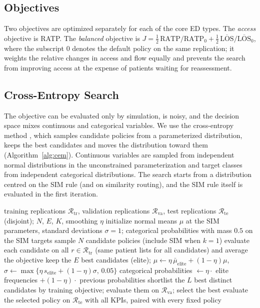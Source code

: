 \subsection{Objectives}

Two objectives are optimized separately for each of the \NEdTypes{} core ED types. The \emph{access} objective is RATP. The \emph{balanced} objective is $J=\tfrac12\,\text{RATP}/\text{RATP}_0+\tfrac12\,\overline{\text{LOS}}/\overline{\text{LOS}}_0$, where the subscript $0$ denotes the default policy on the same replication; it weights the relative changes in access and flow equally and prevents the search from improving access at the expense of patients waiting for reassessment.

\subsection{Cross-Entropy Search}

The objective can be evaluated only by simulation, is noisy, and the decision space mixes continuous and categorical variables. We use the cross-entropy method \cite{deBoer2005_CEMTutorial}, which samples candidate policies from a parameterized distribution, keeps the best candidates and moves the distribution toward them (Algorithm~\ref{alg:cem}). Continuous variables are sampled from independent normal distributions in the unconstrained parameterization and target classes from independent categorical distributions. The search starts from a distribution centred on the SIM rule (and on similarity routing), and the SIM rule itself is evaluated in the first iteration.

\begin{algorithm}[!htbp]
\caption{Cross-entropy search for one ED type and objective}
\label{alg:cem}
\begin{algorithmic}[1]
\REQUIRE training replications $\mathcal{R}_{\text{tr}}$, validation replications $\mathcal{R}_{\text{va}}$, test replications $\mathcal{R}_{\text{te}}$ (disjoint); $N$, $E$, $K$, smoothing $\eta$
\STATE initialize normal means $\mu$ at the SIM parameters, standard deviations $\sigma=1$; categorical probabilities with mass $0.5$ on the SIM targets
\STATE sample $N$ candidate policies (include SIM when $k=1$)
\STATE evaluate each candidate on all $r\in\mathcal{R}_{\text{tr}}$ (same patient lists for all candidates) and average the objective
\STATE keep the $E$ best candidates (elite); $\mu\leftarrow\eta\,\bar\mu_{\text{elite}}+(1-\eta)\mu$, $\sigma\leftarrow\max\{\eta\,s_{\text{elite}}+(1-\eta)\sigma,\,0.05\}$
\STATE categorical probabilities $\leftarrow\eta\cdot$ elite frequencies $+(1-\eta)\cdot$ previous probabilities
\ENDFOR
\STATE shortlist the $L$ best distinct candidates by training objective; evaluate them on $\mathcal{R}_{\text{va}}$; select the best
\STATE evaluate the selected policy on $\mathcal{R}_{\text{te}}$ with all KPIs, paired with every fixed policy
\end{algorithmic}
\end{algorithm}

